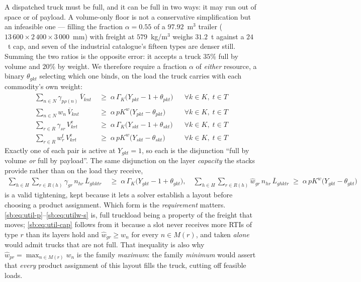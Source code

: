 A dispatched truck must be full, and it can be full in two ways: it may
run out of space or of payload. A volume-only floor is not a
conservative simplification but an infeasible one --- filling the
fraction $\alpha=0.55$ of a $97.92$~m$^{3}$ trailer
($13\,600\times2\,400\times3\,000$~mm) with freight at $579$~kg/m$^{3}$
weighs $31.2$~t against a $24$~t cap, and seven of the industrial
catalogue's fifteen types are denser still. Summing the two ratios is
the opposite error: it accepts a truck $35\%$ full by volume and $20\%$
by weight. We therefore require a fraction $\alpha$ of \emph{either}
resource, a binary $\theta_{gkt}$ selecting which one binds, on the
load the truck carries with each commodity's own weight:
\begin{align}
\sum_{n\in N}\gamma_{p\rho(n)}\,\overline{V}_{knt}
&\;\ge\;\alpha\,\Gamma_{K}\bigl(Y_{pkt}-1+\theta_{pkt}\bigr)
    &&\forall k\in K,\; t\in T
    \label{sb:eq:util-p}\\
\sum_{n\in N} w_{n}\,\overline{V}_{knt}
&\;\ge\;\alpha\,pK^{w}\bigl(Y_{pkt}-\theta_{pkt}\bigr)
    &&\forall k\in K,\; t\in T
    \label{sb:eq:utilw-p}\\
\sum_{r\in R}\gamma_{sr}\,V^{\mathrm{e}}_{krt}
&\;\ge\;\alpha\,\Gamma_{K}\bigl(Y_{skt}-1+\theta_{skt}\bigr)
    &&\forall k\in K,\; t\in T
    \label{sb:eq:util-s}\\
\sum_{r\in R} w^{\mathrm{f}}_{r}\,V^{\mathrm{e}}_{krt}
&\;\ge\;\alpha\,pK^{w}\bigl(Y_{skt}-\theta_{skt}\bigr)
    &&\forall k\in K,\; t\in T
    \label{sb:eq:utilw-s}
\end{align}
Exactly one of each pair is active at $Y_{gkt}=1$, so each is the
disjunction ``full by volume \emph{or} full by payload''. The same
disjunction on the layer \emph{capacity} the stacks provide rather than
on the load they receive,
\begin{align}
  \sum_{h\in H}\sum_{r\in R(h)}
    \gamma_{gr}\,n_{hr}\,\overline{L}_{ghktr}
&\;\ge\;\alpha\,\Gamma_{K}\bigl(Y_{gkt}-1+\theta_{gkt}\bigr),
\quad
  \sum_{h\in H}\sum_{r\in R(h)}
    \hat w_{gr}\,n_{hr}\,\overline{L}_{ghktr}
\;\ge\;\alpha\,pK^{w}\bigl(Y_{gkt}-\theta_{gkt}\bigr)
    \label{sb:eq:util-cap}
\end{align}
is a valid tightening, kept because it lets a solver establish a layout
before choosing a product assignment. Which form is the
\emph{requirement} matters.
\eqref{sb:eq:util-p}--\eqref{sb:eq:utilw-s} is, full truckload being a
property of the freight that moves; \eqref{sb:eq:util-cap} follows from
it because a slot never receives more RTIs of type $r$ than its layers
hold and $\hat w_{gr}\ge w_{n}$ for every $n\in M(r)$, and taken
\emph{alone} would admit trucks that are not full. That inequality is
also why $\hat w_{pr}=\max_{n\in M(r)}w_{n}$ is the family
\emph{maximum}: the family \emph{minimum} would assert that
\emph{every} product assignment of this layout fills the truck, cutting
off feasible loads.

